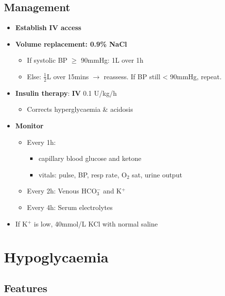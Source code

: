 \documentclass[
  12pt,
]{memoir}
\providecommand{\tightlist}{%
  \setlength{\itemsep}{0pt}\setlength{\parskip}{0pt}}
\begin{document}
\hypertarget{management-3}{%
\subsection{Management}\label{management-3}}

\begin{itemize}
\tightlist
\item
  \textbf{Establish IV access}
\item
  \textbf{Volume replacement: 0.9\% NaCl }

  \begin{itemize}
  \tightlist
  \item
    If systolic BP \(\ge\) 90mmHg: 1L over 1h
  \item
    Else: \(\frac{1}{2}\)L over 15mins \(\rightarrow\) reassess. If BP
    still \textless{} 90mmHg, repeat.
  \end{itemize}
\item
  \textbf{Insulin therapy}: \textbf{IV} 0.1 U/kg/h

  \begin{itemize}
  \tightlist
  \item
    Corrects hyperglycaemia \& acidosis
  \end{itemize}
\item
  \textbf{Monitor}

  \begin{itemize}
  \tightlist
  \item
    Every 1h:

    \begin{itemize}
    \tightlist
    \item
      capillary blood glucose and ketone
    \item
      vitals: pulse, BP, resp rate, O\(_2\) sat, urine output
    \end{itemize}
  \item
    Every 2h: Venous HCO\(_3^{-}\) and K\(^+\)
  \item
    Every 4h: Serum electrolytes
  \end{itemize}
\item
  If K\(^+\) is low, 40mmol/L KCl with normal saline
\end{itemize}

\hypertarget{hypoglycaemia}{%
\section{Hypoglycaemia}\label{hypoglycaemia}}

\hypertarget{features-4}{%
\subsection{Features}\label{features-4}}
\end{document}
